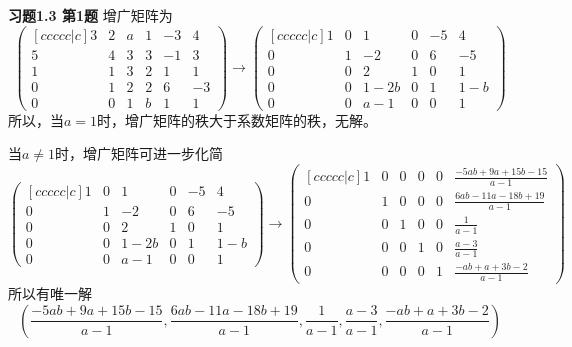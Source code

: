 {\bf 习题1.3 第1题} 增广矩阵为
$$\begin{pmatrix}[ccccc|c] 3 & 2 & a & 1 & -3 & 4 \\ 5 & 4 & 3 & 3 & -1 & 3 \\ 1 & 1 & 3 & 2 & 1 & 1 \\ 0 & 1 & 2 & 2 & 6 & -3 \\ 0 & 0 & 1 & b & 1 & 1 \end{pmatrix}
\to \begin{pmatrix}[ccccc|c] 1 & 0 & 1 & 0 & -5 & 4 \\ 0 & 1 & -2 & 0 & 6 & -5 \\ 0 & 0 & 2 & 1 & 0 & 1 \\ 0 & 0 & 1-2b & 0 & 1 & 1-b \\ 0 & 0 & a-1 & 0 & 0 & 1 \end{pmatrix}$$
所以，当$a=1$时，增广矩阵的秩大于系数矩阵的秩，无解。

当$a\neq 1$时，增广矩阵可进一步化简
$$\begin{pmatrix}[ccccc|c] 1 & 0 & 1 & 0 & -5 & 4 \\ 0 & 1 & -2 & 0 & 6 & -5 \\ 0 & 0 & 2 & 1 & 0 & 1 \\ 0 & 0 & 1-2b & 0 & 1 & 1-b \\ 0 & 0 & a-1 & 0 & 0 & 1 \end{pmatrix}
\to \begin{pmatrix}[ccccc|c] 1 & 0 & 0 & 0 & 0 & \frac{-5ab+9a+15b-15}{a-1} \\ 0 & 1 & 0 & 0 & 0 & \frac{6ab-11a-18b+19}{a-1} \\ 0 & 0 & 1 & 0 & 0 & \frac{1}{a-1} \\ 0 & 0 & 0 & 1 & 0 & \frac{a-3}{a-1} \\ 0 & 0 & 0 & 0 & 1 & \frac{-ab+a+3b-2}{a-1} \end{pmatrix}$$
所以有唯一解
$$\left( \frac{-5ab+9a+15b-15}{a-1}, \frac{6ab-11a-18b+19}{a-1}, \frac{1}{a-1}, \frac{a-3}{a-1}, \frac{-ab+a+3b-2}{a-1} \right)$$

\newpageorvspace

